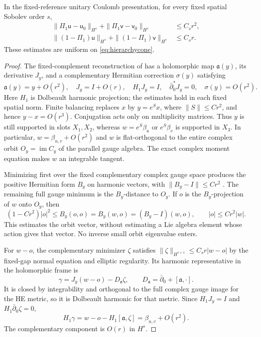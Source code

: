 \begin{lemma}\label{lem:actualstates}
In the fixed-reference unitary Coulomb presentation, for every fixed
spatial Sobolev order $s$,
\begin{align}\label{eq:actualstates}
 \|\Pi_1\mathsf u-\mathsf u_0\|_{H^s}
 +\|\Pi_1\mathsf v-\mathsf v_0\|_{H^s}&\le C_s r^2,\\
 \|(1-\Pi_1)\mathsf u\|_{H^s}
 +\|(1-\Pi_1)\mathsf v\|_{H^s}&\le C_s r.\nonumber
\end{align}
These estimates are uniform on \eqref{eq:hierarchycone}.
\end{lemma}
\begin{proof}
The fixed-complement reconstruction of
\cite[Lemmas~2.1--2.2, Proposition~2.3 and Lemma~3.1]{wuebben15}
has a holomorphic map $\mathfrak a(y)$, its derivative $J_y$, and a
complementary Hermitian correction $\sigma(y)$ satisfying
\begin{equation}\label{eq:reconstructionjets}
 \mathfrak a(y)=y+O(r^2),\quad J_y=I+O(r),\quad
 H_1J_y=I,\quad \bar\partial_0^*J_y=0,\quad \sigma(y)=O(r^2).
\end{equation}
Here $H_1$ is Dolbeault harmonic projection; the estimates hold in each
fixed spatial norm. Finite balancing replaces $x$ by $y=e^Sx$, where
$\|S\|\le Cr^2$, and hence $y-x=O(r^3)$. Conjugation acts only on
multiplicity matrices. Thus $y$ is still supported in slots $X_1,X_2$,
whereas $w=e^S\beta_u$ or $e^S\beta_v$ is supported in $X_3$. In
particular, $w=\beta_{u,v}+O(r^2)$ and $w$ is flat-orthogonal to the
entire complex orbit $O_y=\operatorname{im}C_y$ of the parallel gauge
algebra. The exact complex moment equation makes $w$ an integrable tangent.

Minimizing first over the fixed complementary complex gauge space produces
the positive Hermitian form $B_y$ on harmonic vectors, with
$\|B_y-I\|\le Cr^2$ \cite[Proposition~2.4]{wuebben15}. The remaining full
gauge minimum is the $B_y$-distance to $O_y$. If $o$ is the $B_y$-projection
of $w$ onto $O_y$, then
\begin{equation}\label{eq:orbitvectorbound}
 (1-Cr^2)|o|^2\le B_y(o,o)=B_y(w,o)
             =(B_y-I)(w,o),\qquad |o|\le Cr^2|w|.
\end{equation}
This estimates the orbit vector, without estimating a Lie algebra element
whose action gives that vector. No inverse small orbit eigenvalue enters.

For $w-o$, the complementary minimizer $\zeta$ satisfies
$\|\zeta\|_{H^{s+1}}\le C_s r|w-o|$ by the fixed-gap normal equation
and elliptic regularity. Its harmonic representative in the holomorphic
frame is
\[
 \gamma=J_y(w-o)-D_{\mathfrak a}\zeta,
 \qquad D_{\mathfrak a}=\bar\partial_0+[\mathfrak a,\cdot].
\]
It is closed by integrability and orthogonal to the full complex gauge
image for the HE metric, so it is Dolbeault harmonic for that metric.
Since $H_1J_y=I$ and $H_1\bar\partial_0\zeta=0$,
\[
 H_1\gamma=w-o-H_1[\mathfrak a,\zeta]
           =\beta_{u,v}+O(r^2).
\]
The complementary component is $O(r)$ in $H^s$.


\end{proof}
